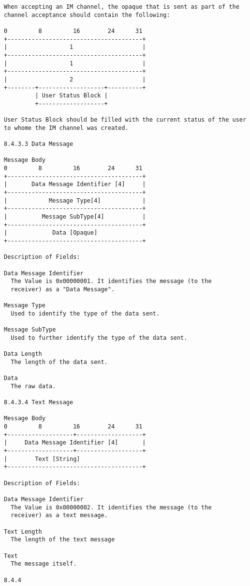 \documentclass[titlepage,oneside]{book}
\begin{document}
\begin{verbatim}
When accepting an IM channel, the opaque that is sent as part of the
channel acceptance should contain the following:

0         8         16        24      31
+---------------------------------------+
|                  1                    |
+---------------------------------------+
|                  1                    |
+---------------------------------------+
|                  2                    |
+--------+-------------------+----------+
         | User Status Block |
         +-------------------+

User Status Block should be filled with the current status of the user
to whome the IM channel was created.

8.4.3.3 Data Message

Message Body
0         8         16        24      31
+---------------------------------------+
|       Data Message Identifier [4]     |
+---------------------------------------+
|            Message Type[4]            |
+---------------------------------------+
|          Message SubType[4]           |
+---------------------------------------+
|             Data [Opaque]
+---------------------------------------+

Description of Fields:

Data Message Identifier
  The Value is 0x00000001. It identifies the message (to the
  receiver) as a "Data Message".

Message Type
  Used to identify the type of the data sent.

Message SubType
  Used to further identify the type of the data sent.

Data Length
  The length of the data sent.

Data
  The raw data.

8.4.3.4 Text Message

Message Body
0         8         16        24      31
+-------------------+-------------------+
|     Data Message Identifier [4]       |
+-------------------+-------------------+
|        Text [String]
+---------------------------------------+

Description of Fields:

Data Message Identifier
  The Value is 0x00000002. It identifies the message (to the
  receiver) as a text message.

Text Length
  The length of the text message

Text
  The message itself.

8.4.4


\end{verbatim}
\end{document}
